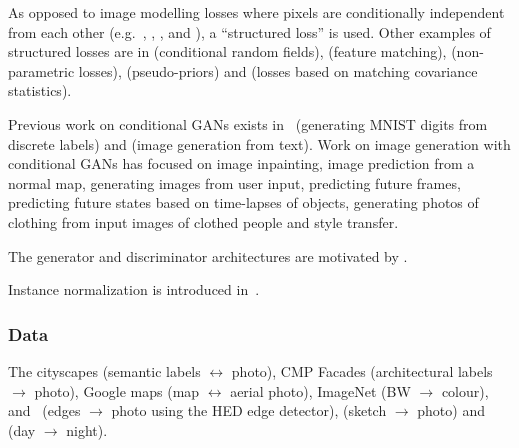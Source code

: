 \documentclass[a4paper, 12pt]{article}
\begin{document}
As opposed to image modelling losses where pixels are conditionally independent
from each other (e.g.~\citet{DBLP:journals/corr/ShelhamerLD16},
\citet{DBLP:journals/corr/XieT15}, \citet{IizukaSIGGRAPH2016},
\citet{DBLP:journals/corr/LarssonMS16} and \citet{DBLP:journals/corr/ZhangIE16}),
a ``structured loss'' is used. Other examples of structured losses are in
\citet{DBLP:journals/corr/ChenPKMY14} (conditional random fields),
\citet{DBLP:journals/corr/DosovitskiyB16} (feature matching),
\citet{DBLP:journals/corr/LiW16} (non-parametric losses),
\citet{DBLP:journals/corr/XieHT15} (pseudo-priors) and
\citet{DBLP:journals/corr/JohnsonAL16} (losses based on matching covariance
statistics).

Previous work on conditional GANs exists in~\citet{DBLP:journals/corr/MirzaO14}
(generating MNIST digits from discrete labels) and
\citet{DBLP:journals/corr/ReedAYLSL16} (image generation from text). Work on
image generation with conditional GANs has focused on image
inpainting\citet{DBLP:journals/corr/PathakKDDE16}, image prediction from a
normal map\citet{DBLP:journals/corr/WangG16}, generating images from user
input\citet{DBLP:journals/corr/WangG16}, predicting future
frames\citet{DBLP:journals/corr/MathieuCL15}, predicting future states based on
time-lapses of objects\citet{DBLP:journals/corr/ZhouB16b}, generating photos of
clothing from input images of clothed people\citet{DBLP:journals/corr/YooKPPK16}
and style transfer\citet{DBLP:journals/corr/LiW16b}.

The generator and discriminator architectures are motivated by
\citet{DBLP:journals/corr/RadfordMC15}.

Instance normalization is introduced in~\citet{DBLP:journals/corr/UlyanovVL16}.

\subsubsection{Data}

The cityscapes\citet{Cordts_2016_CVPR} (semantic labels $\leftrightarrow$
photo), CMP Facades (architectural labels $\rightarrow$ photo), Google maps
(map $\leftrightarrow$ aerial photo),
ImageNet\citet{DBLP:journals/corr/RussakovskyDSKSMHKKBBF14} (BW $\rightarrow$
colour), \citet{zhu2016generative} and~\citet{fine-grained} (edges
$\rightarrow$ photo using the HED edge
detector\citet{DBLP:journals/corr/XieT15}),
\citet{Eitz:2012:HSO:2185520.2185540} (sketch $\rightarrow$ photo) and
\citet{Laffont14} (day $\rightarrow$ night).
\end{document}
